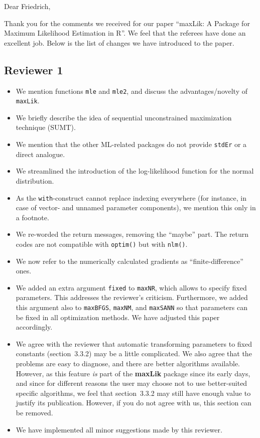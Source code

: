 \documentclass[12pt,parskip=half]{scrartcl}
\begin{document}
Dear Friedrich,

\bigskip

Thank you for the comments we received for our paper ``maxLik: A
Package for Maximum Likelihood Estimation in R''.  We feel that the
referees have done an excellent job.  Below is the list of changes we
have introduced to the paper.

\subsection*{Reviewer 1}

\begin{itemize}
\item We mention functions \texttt{mle} and \texttt{mle2}, and discuss
  the advantages/novelty of \texttt{maxLik}.
\item We briefly describe the idea of sequential unconstrained
  maximization technique (SUMT).
\item We mention that the other ML-related packages do not provide
  \texttt{stdEr} or a direct analogue.
\item We streamlined the introduction of the log-likelihood function
   for the normal distribution.
\item As the \texttt{with}-construct cannot replace indexing
  everywhere (for instance, in case of vector- and unnamed
  parameter components), we mention this only in a footnote.
\item We re-worded the return messages, removing the ``maybe'' part.
  The return codes are not compatible with \texttt{optim()}
  but with \texttt{nlm()}.
\item We now refer to the numerically calculated gradients as
  ``finite-difference'' ones.
\item We added an extra argument \texttt{fixed} to
  \texttt{maxNR}, which allows to specify fixed parameters.  This
  addresses the reviewer's criticism.
  Furthermore, we added this argument also to \texttt{maxBFGS},
  \texttt{maxNM}, and \texttt{maxSANN}
  so that parameters can be fixed in all optimization methods.
  We have adjusted this paper accordingly.
\item We agree with the reviewer that automatic transforming parameters
  to fixed constants (section~3.3.2) may be a little complicated.  We
  also agree that the problems are easy to diagnose, and there are
  better algorithms available.  However, as this feature \emph{is}
  part of the \textbf{maxLik} package since its early days, and since for different
  reasons
  the user may choose not to use better-suited specific algorithms, we
  feel that section~3.3.2 may still have enough value to justify its
  publication.  However, if you do not agree with us, this section can be
  removed.
\item We have implemented all minor suggestions made by this reviewer.
\end{itemize}
\end{document}
